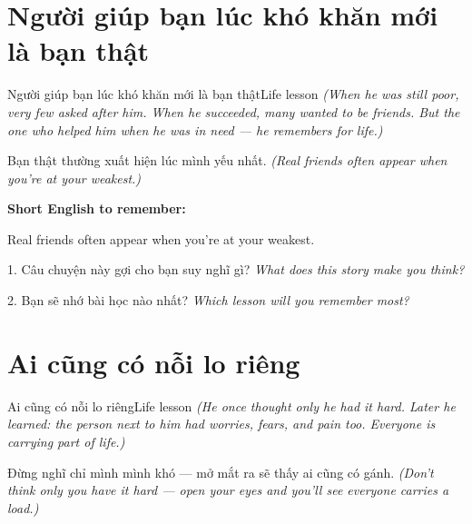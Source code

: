 \section{Người giúp bạn lúc khó khăn mới là bạn thật}
\begin{truyen}{Người giúp bạn lúc khó khăn mới là bạn thật}{Life lesson}
\textit{(When he was still poor, very few asked after him. When he succeeded, many wanted to be friends. But the one who helped him when he was in need — he remembers for life.)}
\end{truyen}

\begin{baihoc}
Bạn thật thường xuất hiện lúc mình yếu nhất.
\textit{(Real friends often appear when you're at your weakest.)}
\end{baihoc}

\begin{ghinhoanh}
\textbf{Short English to remember:}

Real friends often appear when you're at your weakest.

\end{ghinhoanh}

\begin{tuhocnhanh}
1. Câu chuyện này gợi cho bạn suy nghĩ gì? \textit{What does this story make you think?}

2. Bạn sẽ nhớ bài học nào nhất? \textit{Which lesson will you remember most?}
\end{tuhocnhanh}
\ngancach


\section{Ai cũng có nỗi lo riêng}
\begin{truyen}{Ai cũng có nỗi lo riêng}{Life lesson}
\textit{(He once thought only he had it hard. Later he learned: the person next to him had worries, fears, and pain too. Everyone is carrying part of life.)}
\end{truyen}

\begin{baihoc}
Đừng nghĩ chỉ mình mình khó — mở mắt ra sẽ thấy ai cũng có gánh.
\textit{(Don't think only you have it hard — open your eyes and you'll see everyone carries a load.)}
\end{baihoc}

